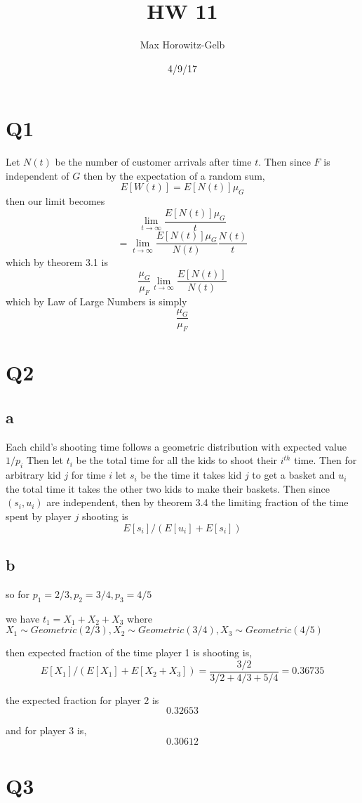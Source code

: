 \documentclass{article}
\title{HW 11}
\author{Max Horowitz-Gelb}
\date{4/9/17}
\begin{document}
\maketitle
\section*{Q1}
Let $N(t)$ be the number of customer arrivals after time $t$. 
Then since $F$ is independent of $G$ then by the expectation of a random sum,
$$
E[W(t)] = E[N(t)]\mu_G
$$
then our limit becomes
$$
\lim_{t \to \infty} \frac{E[N(t)]\mu_G}{t} 
$$
$$
= \lim_{t \to \infty} \frac{E[N(t)]\mu_G}{N(t)}\frac{N(t)}{t}
$$
which by theorem 3.1 is
$$
\frac{\mu_G}{\mu_F} \lim_{t \to \infty} \frac{E[N(t)]}{N(t)} 
$$
which by Law of Large Numbers is simply
$$
\frac{\mu_G}{\mu_F}
$$

\section*{Q2}
\subsection*{a}
Each child's shooting time follows a geometric distribution with expected value $1/p_i$
Then let $t_i$ be the total time for all the kids to shoot their $i^{th}$ time. 
Then for arbitrary kid $j$ for time $i$ let 
$s_i$ be the time it takes kid $j$ to get a basket and $u_i$  the total time it takes the other two kids to make their baskets. 
Then since $(s_i, u_i)$ are independent, then by theorem 3.4 the limiting fraction of the time spent by player $j$ shooting is 
$$
E[s_i] / (E[u_i] + E[s_i])
$$  

\subsection*{b}
so for $p_1 = 2/3, p_2 = 3/4, p_3 = 4/5$ 

we have $t_1 = X_1 + X_2 + X_3$ where $X_1 \sim Geometric(2/3), X_2 \sim Geometric(3/4), X_3 \sim Geometric(4/5)$ 

then expected fraction of the time player 1 is shooting is,
$$
E[X_1]/(E[X_1] + E[X_2 + X_3]) = \frac{3/2}{3/2 + 4/3 + 5/4} = 0.36735
$$

the expected fraction for player 2 is 
$$
0.32653
$$

and for player 3 is,
$$
0.30612
$$

\section*{Q3}
\end{document}
